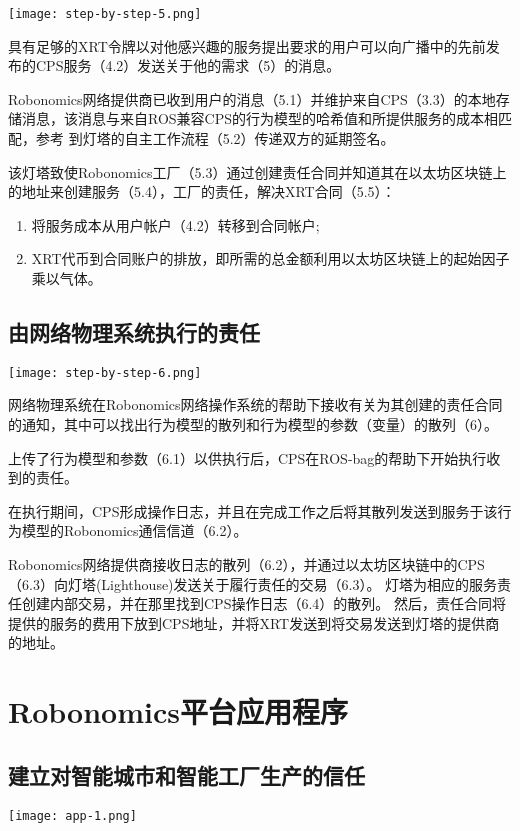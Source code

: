 \documentclass[UTF8]{article}
\begin{document}
\texttt{[image: step-by-step-5.png]} 

具有足够的XRT令牌以对他感兴趣的服务提出要求的用户可以向广播中的先前发布的CPS服务（4.2）发送关于他的需求（5）的消息。

Robonomics网络提供商已收到用户的消息（5.1）并维护来自CPS（3.3）的本地存储消息，该消息与来自ROS兼容CPS的行为模型的哈希值和所提供服务的成本相匹配，参考 到灯塔的自主工作流程（5.2）传递双方的延期签名。

该灯塔致使Robonomics工厂（5.3）通过创建责任合同并知道其在以太坊区块链上的地址来创建服务（5.4），工厂的责任，解决XRT合同（5.5）：
\begin{enumerate}
	\item 将服务成本从用户帐户（4.2）转移到合同帐户;
	\item XRT代币到合同账户的排放，即所需的总金额利用以太坊区块链上的起始因子乘以气体。
\end{enumerate}

\subsection{由网络物理系统执行的责任}

\texttt{[image: step-by-step-6.png]} 

网络物理系统在Robonomics网络操作系统的帮助下接收有关为其创建的责任合同的通知，其中可以找出行为模型的散列和行为模型的参数（变量）的散列（6）。

上传了行为模型和参数（6.1）以供执行后，CPS在ROS-bag的帮助下开始执行收到的责任。

在执行期间，CPS形成操作日志，并且在完成工作之后将其散列发送到服务于该行为模型的Robonomics通信信道（6.2）。

Robonomics网络提供商接收日志的散列（6.2），并通过以太坊区块链中的CPS（6.3）向灯塔(Lighthouse)发送关于履行责任的交易（6.3）。 灯塔为相应的服务责任创建内部交易，并在那里找到CPS操作日志（6.4）的散列。 然后，责任合同将提供的服务的费用下放到CPS地址，并将XRT发送到将交易发送到灯塔的提供商的地址。

\section{Robonomics平台应用程序}

\subsection{建立对智能城市和智能工厂生产的信任}

\texttt{[image: app-1.png]} 
\end{document}
